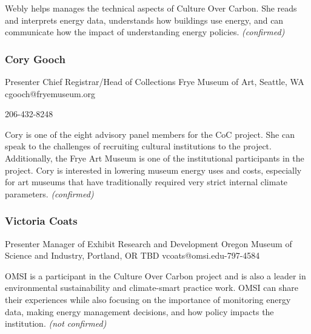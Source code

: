 \documentclass{report}
\begin{document}
                Webly helps manages the technical aspects of Culture Over Carbon. She reads and interprets energy data, understands how buildings use energy, and can communicate how the impact of understanding energy policies.
                \emph{ (confirmed) }
              

              
                \subsubsection*{ Cory Gooch }
                Presenter\newline
                Chief Registrar/Head of Collections\newline
                Frye Museum of Art, Seattle, WA
                \newline
                cgooch@fryemuseum.org\newline
                
                206-432-8248\newline

                Cory is one of the eight advisory panel members for the CoC project. She can speak to the challenges of recruiting cultural institutions to the project. Additionally, the Frye Art Museum is one of the institutional participants in the project.  Cory is interested in lowering museum energy uses and costs, especially for art museums that have traditionally required very strict internal climate parameters.
                \emph{ (confirmed) }
              

              
                \subsubsection*{ Victoria Coats }
                Presenter\newline
                Manager of Exhibit Research and Development\newline
                Oregon Museum of Science and Industry, Portland, OR
                \newline
                TBD\newline
                vcoats@omsi.edu-797-4584\newline

                OMSI is a participant in the Culture Over Carbon project and is also a leader in environmental sustainability and climate-smart practice work. OMSI can share their experiences while also focusing on the importance of monitoring energy data, making energy management decisions, and how policy impacts the institution.
                \emph{ (not confirmed) }
              
\end{document}
